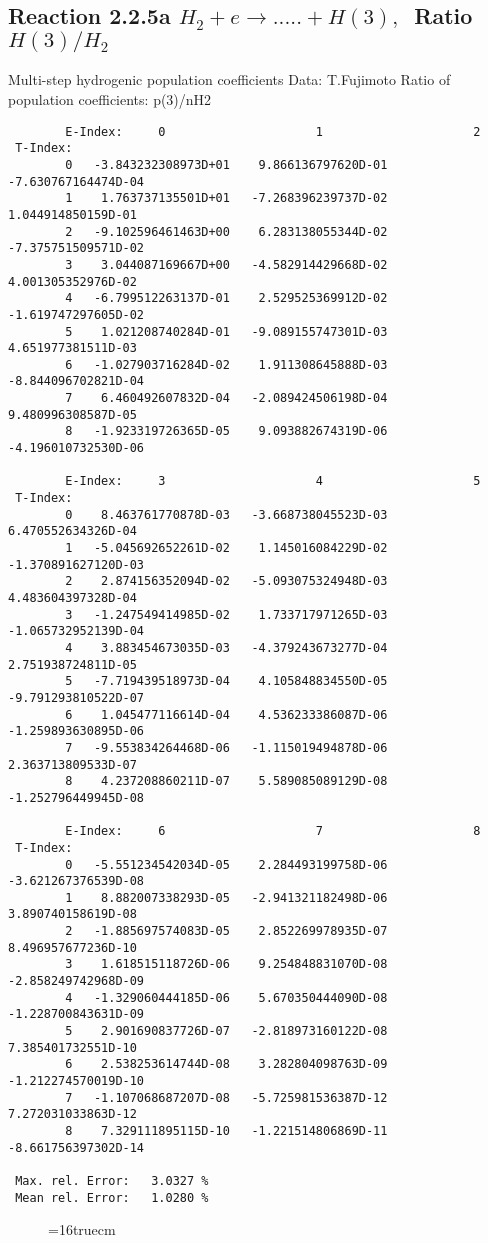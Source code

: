 \documentclass[12pt]{article}
\begin{document}
\subsection{
Reaction 2.2.5a $ H_2 + e \rightarrow .....+ H(3), \   $
Ratio $H(3)/H_2 $
}
 Multi-step hydrogenic population coefficients
 Data: T.Fujimoto
 Ratio of population coefficients: p(3)/nH2


\begin{small}\begin{verbatim}
        E-Index:     0                     1                     2
 T-Index:
        0   -3.843232308973D+01    9.866136797620D-01   -7.630767164474D-04
        1    1.763737135501D+01   -7.268396239737D-02    1.044914850159D-01
        2   -9.102596461463D+00    6.283138055344D-02   -7.375751509571D-02
        3    3.044087169667D+00   -4.582914429668D-02    4.001305352976D-02
        4   -6.799512263137D-01    2.529525369912D-02   -1.619747297605D-02
        5    1.021208740284D-01   -9.089155747301D-03    4.651977381511D-03
        6   -1.027903716284D-02    1.911308645888D-03   -8.844096702821D-04
        7    6.460492607832D-04   -2.089424506198D-04    9.480996308587D-05
        8   -1.923319726365D-05    9.093882674319D-06   -4.196010732530D-06

        E-Index:     3                     4                     5
 T-Index:
        0    8.463761770878D-03   -3.668738045523D-03    6.470552634326D-04
        1   -5.045692652261D-02    1.145016084229D-02   -1.370891627120D-03
        2    2.874156352094D-02   -5.093075324948D-03    4.483604397328D-04
        3   -1.247549414985D-02    1.733717971265D-03   -1.065732952139D-04
        4    3.883454673035D-03   -4.379243673277D-04    2.751938724811D-05
        5   -7.719439518973D-04    4.105848834550D-05   -9.791293810522D-07
        6    1.045477116614D-04    4.536233386087D-06   -1.259893630895D-06
        7   -9.553834264468D-06   -1.115019494878D-06    2.363713809533D-07
        8    4.237208860211D-07    5.589085089129D-08   -1.252796449945D-08

        E-Index:     6                     7                     8
 T-Index:
        0   -5.551234542034D-05    2.284493199758D-06   -3.621267376539D-08
        1    8.882007338293D-05   -2.941321182498D-06    3.890740158619D-08
        2   -1.885697574083D-05    2.852269978935D-07    8.496957677236D-10
        3    1.618515118726D-06    9.254848831070D-08   -2.858249742968D-09
        4   -1.329060444185D-06    5.670350444090D-08   -1.228700843631D-09
        5    2.901690837726D-07   -2.818973160122D-08    7.385401732551D-10
        6    2.538253614744D-08    3.282804098763D-09   -1.212274570019D-10
        7   -1.107068687207D-08   -5.725981536387D-12    7.272031033863D-12
        8    7.329111895115D-10   -1.221514806869D-11   -8.661756397302D-14

 Max. rel. Error:   3.0327 %
 Mean rel. Error:   1.0280 %

\end{verbatim}\end{small}
\begin{figure} \label{2.2.5a}
\epsfxsize=16truecm
\end{figure}
\newpage
\end{document}
